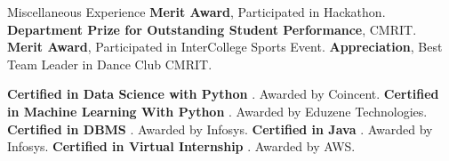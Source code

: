 
\begin{rubric}{Miscellaneous Experience}
\entry*[2021] \textbf{Merit Award}, Participated in Hackathon.
%
\entry*[2021] \textbf{Department Prize for Outstanding Student Performance}, CMRIT.
%
\entry*[2021] \textbf{Merit Award}, Participated in InterCollege Sports Event.
%
\entry*[2021] \textbf{Appreciation}, Best Team Leader in Dance Club CMRIT.


\entry*[2022] \textbf{Certified in Data Science with Python }. Awarded by Coincent.
\entry*[2022] \textbf{Certified in Machine Learning With Python }. Awarded by Eduzene Technologies.
\entry*[2022] \textbf{Certified in DBMS }. Awarded by Infosys.
\entry*[2022] \textbf{Certified in Java }. Awarded by Infosys.
\entry*[2023] \textbf{Certified in Virtual Internship }. Awarded by AWS.
\end{rubric}
